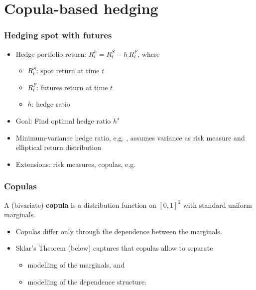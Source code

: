 \documentclass[10pt,mathserif]{beamer}
\renewcommand{\(}{\begin{columns}}
\renewcommand{\)}{\end{columns}}
\newcommand{\<}[1]{\begin{column}{#1}}
\renewcommand{\>}{\end{column}}
\theoremstyle{definition}
\begin{document}
\section{Copula-based hedging}

\begin{frame}
  \frametitle{Hedging spot with futures}
  \begin{itemize}
      \addtolength{\itemsep}{3pt}
  \item Hedge portfolio return: $R_t^h = R_t^S - h\, R_t^F$, where
    \begin{itemize}
      \addtolength{\itemsep}{3pt}
    \item $R_t^S$: spot return at time $t$
    \item $R_t^F$: futures return at time $t$
    \item $h$: hedge ratio
    \end{itemize}
  \item Goal: Find optimal hedge ratio $h^\star$
  \item Minimum-variance hedge ratio, e.g. \cite{Ederington1979},
    assumes variance as risk measure and elliptical return
    distribution 
  \item Extensions: risk measures, copulas, e.g.\
    \citep{Harris2006,Barbi2014} 
  \end{itemize}
\end{frame}

\begin{frame}
  \frametitle{Copulas}
  \begin{definition}
    A (bivariate) {\bf copula} is a distribution function on $[0,1]^2$
    with standard uniform marginals.
  \end{definition}
  \begin{itemize}
    \addtolength{\itemsep}{3pt}
  \item Copulas differ only through the dependence between the
    marginals.
  \item Sklar's Theorem (below) captures that copulas allow to
    separate
    \begin{itemize}
      \addtolength{\itemsep}{3pt}
    \item modelling of the marginals, and
    \item modelling of the dependence structure.
    \end{itemize}
  \end{itemize}
\end{frame}
\end{document}
